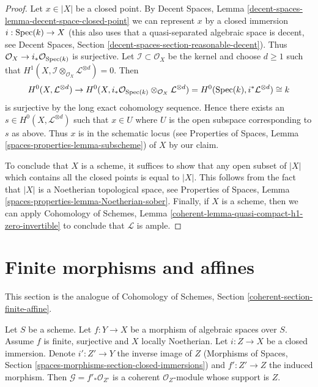 \begin{proof}
\medskip\noindent
Let $x \in |X|$ be a closed point. By Decent Spaces, Lemma
\ref{decent-spaces-lemma-decent-space-closed-point}
we can represent $x$ by a closed immersion $i : \mathop{\mathrm{Spec}}(k) \to X$
(this also uses that a quasi-separated algebraic space is
decent, see Decent Spaces, Section
\ref{decent-spaces-section-reasonable-decent}).
Thus $\mathcal{O}_X \to i_*\mathcal{O}_{\mathop{\mathrm{Spec}}(k)}$ is surjective.
Let $\mathcal{I} \subset \mathcal{O}_X$ be the kernel and choose
$d \geq 1$ such that
$H^1(X, \mathcal{I} \otimes_{\mathcal{O}_X} \mathcal{L}^{\otimes d}) = 0$.
Then
$$
H^0(X, \mathcal{L}^{\otimes d}) \to
H^0(X,
i_*\mathcal{O}_{\mathop{\mathrm{Spec}}(k)} \otimes_{\mathcal{O}_X} \mathcal{L}^{\otimes d}) =
H^0(\mathop{\mathrm{Spec}}(k), i^*\mathcal{L}^{\otimes d}) \cong k
$$
is surjective by the long exact cohomology sequence. Hence
there exists an $s \in H^0(X, \mathcal{L}^{\otimes d})$
such that $x \in U$ where $U$ is the open subspace corresponding to $s$
as above. Thus $x$ is in the schematic locus
(see Properties of Spaces, Lemma \ref{spaces-properties-lemma-subscheme})
of $X$ by our claim.

\medskip\noindent
To conclude that $X$ is a scheme, it suffices to show that
any open subset of $|X|$ which contains all the closed points
is equal to $|X|$. This follows from the fact that $|X|$
is a Noetherian topological space, see
Properties of Spaces, Lemma \ref{spaces-properties-lemma-Noetherian-sober}.
Finally, if $X$ is a scheme, then we can apply
Cohomology of Schemes, Lemma
\ref{coherent-lemma-quasi-compact-h1-zero-invertible}
to conclude that $\mathcal{L}$ is ample.
\end{proof}









\section{Finite morphisms and affines}
\label{section-finite-affine}

\noindent
This section is the analogue of
Cohomology of Schemes, Section \ref{coherent-section-finite-affine}.

\begin{lemma}
\label{lemma-finite-morphism-Noetherian}
Let $S$ be a scheme. Let $f : Y \to X$ be a morphism of algebraic spaces
over $S$. Assume $f$ is finite, surjective and $X$ locally Noetherian.
Let $i : Z \to X$ be a closed immersion. Denote $i' : Z' \to Y$
the inverse image of $Z$
(Morphisms of Spaces, Section \ref{spaces-morphisms-section-closed-immersions})
and $f' : Z' \to Z$
the induced morphism. Then $\mathcal{G} = f'_*\mathcal{O}_{Z'}$
is a coherent $\mathcal{O}_Z$-module whose support is $Z$.
\end{lemma}


